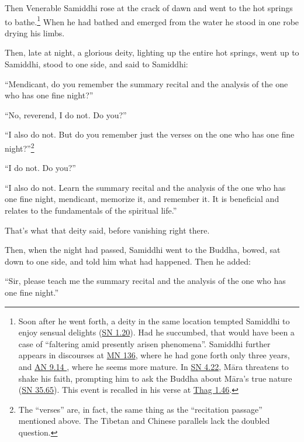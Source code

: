 \documentclass[12pt,openany]{book}%
\begin{document}
Then Venerable Samiddhi rose at the crack of dawn and went to the hot springs to bathe.\footnote{Soon after he went forth, a deity in the same location tempted Samiddhi to enjoy sensual delights (\href{https://suttacentral.net/sn1.20/en/sujato}{SN 1.20}). Had he succumbed, that would have been a case of “faltering amid presently arisen phenomena”. Samiddhi further appears in discourses at \href{https://suttacentral.net/mn136/en/sujato}{MN 136}, where he had gone forth only three years, and \href{https://suttacentral.net/an9.14 /en/sujato}{AN 9.14 }, where he seems more mature. In \href{https://suttacentral.net/sn4.22/en/sujato}{SN 4.22}, \textsanskrit{Māra} threatens to shake his faith, prompting him to ask the Buddha about \textsanskrit{Māra}’s true nature (\href{https://suttacentral.net/sn35.65/en/sujato}{SN 35.65}). This event is recalled in his verse at \href{https://suttacentral.net/thag1.46/en/sujato}{Thag 1.46}. } When he had bathed and emerged from the water he stood in one robe drying his limbs. 

Then, late at night, a glorious deity, lighting up the entire hot springs, went up to Samiddhi, stood to one side, and said to Samiddhi: 

“Mendicant, do you remember the summary recital and the analysis of the one who has one fine night?” 

“No, reverend, I do not. Do you?” 

“I also do not. But do you remember just the verses on the one who has one fine night?”\footnote{The “verses” are, in fact, the same thing as the “recitation passage” mentioned above. The Tibetan and Chinese parallels lack the doubled question. } 

“I do not. Do you?” 

“I also do not. Learn the summary recital and the analysis of the one who has one fine night, mendicant, memorize it, and remember it. It is beneficial and relates to the fundamentals of the spiritual life.” 

That’s what that deity said, before vanishing right there. 

Then, when the night had passed, Samiddhi went to the Buddha, bowed, sat down to one side, and told him what had happened. Then he added: 

“Sir, please teach me the summary recital and the analysis of the one who has one fine night.” 
\end{document}
